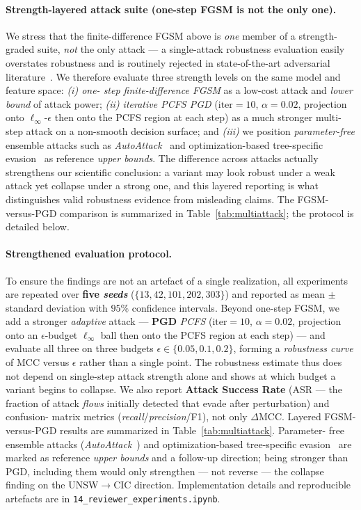 \documentclass[preprint,12pt,authoryear]{elsarticle}
\begin{document}
\paragraph{Strength-layered attack suite (one-step FGSM is not the only one).} We
stress that the finite-difference FGSM above is \emph{one} member of a strength-
graded suite, \emph{not} the only attack --- a single-attack robustness evaluation
easily overstates robustness and is routinely rejected in state-of-the-art
adversarial literature~\citep{athalye2018,carlini2019evaluating}. We therefore
evaluate three strength levels on the same model and feature space: \emph{(i) one-
step finite-difference FGSM} as a low-cost attack and \emph{lower bound} of attack
power; \emph{(ii) iterative PCFS PGD} ($\text{iter}=10$, $\alpha=0.02$, projection
onto $\ell_\infty$-$\epsilon$ then onto the PCFS region at each step) as a much
stronger multi-step attack on a non-smooth decision surface; and \emph{(iii)} we
position \emph{parameter-free} ensemble attacks such as
\emph{AutoAttack}~\citep{croce2020autoattack} and optimization-based tree-specific
evasion~\citep{kantchelian2016} as reference \emph{upper bounds}. The difference
across attacks actually strengthens our scientific conclusion: a variant may look
robust under a weak attack yet collapse under a strong one, and this layered
reporting is what distinguishes valid robustness evidence from misleading claims.
The FGSM-versus-PGD comparison is summarized in Table~\ref{tab:multiattack}; the
protocol is detailed below.

\paragraph{Strengthened evaluation protocol.} To ensure the findings are not an
artefact of a single realization, all experiments are repeated over \textbf{five
\emph{seeds}} ($\{13,42,101,202,303\}$) and reported as mean $\pm$ standard deviation
with $95\%$ confidence intervals. Beyond one-step FGSM, we add a stronger
\emph{adaptive} attack --- \textbf{PGD} \emph{PCFS} ($\text{iter}=10$,
$\alpha=0.02$, projection onto an $\epsilon$-budget $\ell_\infty$ ball then onto the
PCFS region at each step) --- and evaluate all three on three budgets
$\epsilon\in\{0.05,0.1,0.2\}$, forming a \emph{robustness curve} of MCC versus
$\epsilon$ rather than a single point. The robustness estimate thus does not depend
on single-step attack strength alone and shows at which budget a variant begins to
collapse. We also report \textbf{Attack Success Rate} (ASR --- the fraction of
attack \emph{flows} initially detected that evade after perturbation) and confusion-
matrix metrics (\emph{recall}/\emph{precision}/F1), not only $\Delta$MCC. Layered
FGSM-versus-PGD results are summarized in Table~\ref{tab:multiattack}. Parameter-
free ensemble attacks (\emph{AutoAttack}~\citep{croce2020autoattack}) and
optimization-based tree-specific evasion~\citep{kantchelian2016} are marked as
reference \emph{upper bounds} and a follow-up direction; being stronger than PGD,
including them would only strengthen --- not reverse --- the collapse finding on the
UNSW$\rightarrow$CIC direction. Implementation details and reproducible artefacts
are in \texttt{14\_reviewer\_experiments.ipynb}.
\end{document}
